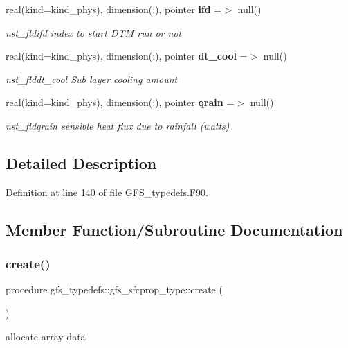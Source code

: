 \begin{DoxyCompactItemize}
real(kind=kind\+\_\+phys), dimension(\+:), pointer \textbf{ ifd} =$>$ null()
\begin{DoxyCompactList}\small\item\em nst\+\_\+fldifd index to start D\+TM run or not \end{DoxyCompactList}\item 
real(kind=kind\+\_\+phys), dimension(\+:), pointer \textbf{ dt\+\_\+cool} =$>$ null()
\begin{DoxyCompactList}\small\item\em nst\+\_\+flddt\+\_\+cool Sub layer cooling amount \end{DoxyCompactList}\item 
real(kind=kind\+\_\+phys), dimension(\+:), pointer \textbf{ qrain} =$>$ null()
\begin{DoxyCompactList}\small\item\em nst\+\_\+fldqrain sensible heat flux due to rainfall (watts) \end{DoxyCompactList}\end{DoxyCompactItemize}


\subsection{Detailed Description}


Definition at line 140 of file G\+F\+S\+\_\+typedefs.\+F90.



\subsection{Member Function/\+Subroutine Documentation}
\mbox{\label{structgfs__typedefs_1_1gfs__sfcprop__type_aa1768ddfddbb047969ea14b1903561bc}} 
\subsubsection{create()}
{\footnotesize\ttfamily procedure gfs\+\_\+typedefs\+::gfs\+\_\+sfcprop\+\_\+type\+::create (\begin{DoxyParamCaption}{ }\end{DoxyParamCaption})}



allocate array data 



